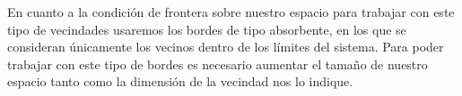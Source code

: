 En cuanto a la condición de frontera sobre nuestro espacio para trabajar con este tipo de vecindades usaremos los bordes de tipo absorbente\cite{ACaplicacionesComputacion}, en los que se consideran únicamente los vecinos dentro de los límites del sistema. Para poder trabajar con este tipo de bordes es necesario aumentar el tamaño de nuestro espacio tanto como la dimensión de la vecindad nos lo indique.